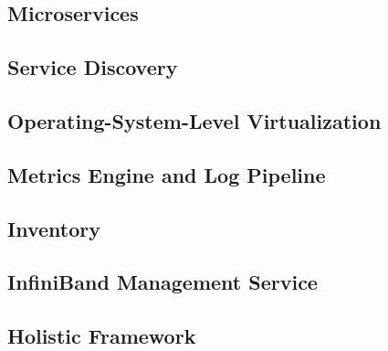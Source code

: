 \subsection{Microservices}



\subsection{Service Discovery}


\subsection{Operating-System-Level Virtualization}


\subsection{Metrics Engine and Log Pipeline}




\subsection{Inventory}


\subsection{InfiniBand Management Service}


\subsection{Holistic Framework}

